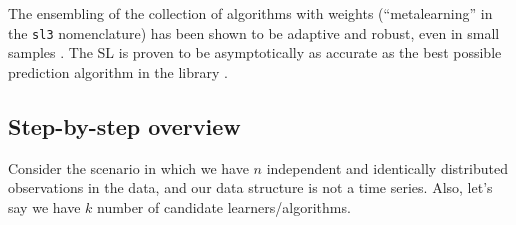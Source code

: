 \documentclass[12pt, krantz2,]{book}
\theoremstyle{definition}
\theoremstyle{definition}
\theoremstyle{definition}
\newcommand{\1}{\mathbbm{1}}
\begin{document}
The ensembling of the collection of algorithms with weights (``metalearning'' in
the \texttt{sl3} nomenclature) has been shown to be adaptive and robust, even in small
samples \citep{polley2010super}. The SL is proven to be asymptotically as accurate as
the best possible prediction algorithm in the library \citep{vdl2003unified, vaart2006oracle}.

\hypertarget{step-by-step-overview}{%
\subsection*{Step-by-step overview}\label{step-by-step-overview}}


Consider the scenario in which we have \(n\) independent and identically
distributed observations in the data, and our data structure is not a time
series. Also, let's say we have \(k\) number of candidate learners/algorithms.
\end{document}
